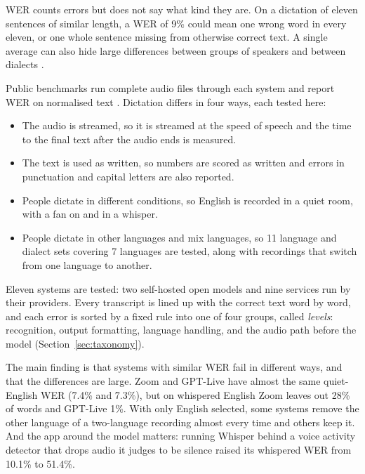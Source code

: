 \documentclass[11pt]{article}
\begin{document}
WER counts errors but does not say what kind they are. On a dictation of eleven sentences of similar length, a WER of 9\% could mean one wrong word in every eleven, or one whole sentence missing from otherwise correct text. A single average can also hide large differences between groups of speakers \citep{koenecke2020racial} and between dialects \citep{talafha2024casablanca}.

Public benchmarks run complete audio files through each system and report WER on normalised text \citep{radford2023whisper,srivastav2026openasr}. Dictation differs in four ways, each tested here:
\begin{itemize}\itemsep0pt
  \item The audio is streamed, so it is streamed at the speed of speech and the time to the final text after the audio ends is measured.
  \item The text is used as written, so numbers are scored as written and errors in punctuation and capital letters are also reported.
  \item People dictate in different conditions, so English is recorded in a quiet room, with a fan on and in a whisper.
  \item People dictate in other languages and mix languages, so 11 language and dialect sets covering 7 languages are tested, along with recordings that switch from one language to another.
\end{itemize}

Eleven systems are tested: two self-hosted open models and nine services run by their providers. Every transcript is lined up with the correct text word by word, and each error is sorted by a fixed rule into one of four groups, called \emph{levels}: recognition, output formatting, language handling, and the audio path before the model (Section~\ref{sec:taxonomy}).

The main finding is that systems with similar WER fail in different ways, and that the differences are large. Zoom and GPT-Live have almost the same quiet-English WER (7.4\% and 7.3\%), but on whispered English Zoom leaves out 28\% of words and GPT-Live 1\%. With only English selected, some systems remove the other language of a two-language recording almost every time and others keep it. And the app around the model matters: running Whisper behind a voice activity detector that drops audio it judges to be silence raised its whispered WER from 10.1\% to 51.4\%.
\end{document}

